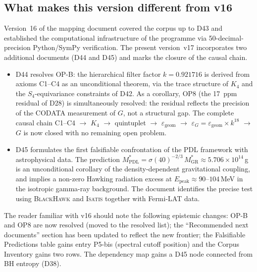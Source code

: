 \documentclass[11pt,a4paper]{article}
\theoremstyle{plain}
\theoremstyle{definition}
\theoremstyle{remark}
\begin{document}
\subsection{What makes this version different from v16}
\label{subsec:diffv16}
Version~16 of the mapping document covered the corpus up to D43 and established the computational infrastructure of the programme via 50-decimal-precision Python/SymPy verification. The present version~v17 incorporates two additional documents (D44 and D45) and marks the closure of the causal chain.

\begin{itemize}
\item D44 resolves OP-B: the hierarchical filter factor $k = 0.921716$ is derived from axioms C1--C4 as an unconditional theorem, via the trace structure of $K_4$ and the $S_4$-equivariance constraints of D42. As a corollary, OP8 (the 17~ppm residual of D28) is simultaneously resolved: the residual reflects the precision of the CODATA measurement of $G$, not a structural gap. The complete causal chain C1--C4 $\to$ $K_4$ $\to$ quintuplet $\to$ $\varepsilon_{\mathrm{geom}}$ $\to$ $\varepsilon_G = \varepsilon_{\mathrm{geom}} \times k^{18}$ $\to$ $G$ is now closed with no remaining open problem.
\item D45 formulates the first falsifiable confrontation of the PDL framework with astrophysical data. The prediction $M^*_{\mathrm{PDL}} = \sigma(40)^{-2/3}\,M^*_{\mathrm{GR}} \approx 5.706 \times 10^{14}$\,g is an unconditional corollary of the density-dependent gravitational coupling, and implies a non-zero Hawking radiation excess at $E_{\mathrm{peak}} \approx 90$--$104$\,MeV in the isotropic gamma-ray background. The document identifies the precise test using \textsc{BlackHawk} and \textsc{Isatis} together with Fermi-LAT data.
\end{itemize}

The reader familiar with v16 should note the following epistemic changes: OP-B and OP8 are now resolved (moved to the resolved list); the ``Recommended next documents'' section has been updated to reflect the new frontier; the Falsifiable Predictions table gains entry P5-bis (spectral cutoff position) and the Corpus Inventory gains two rows. The dependency map gains a D45 node connected from BH entropy (D38).
\end{document}
